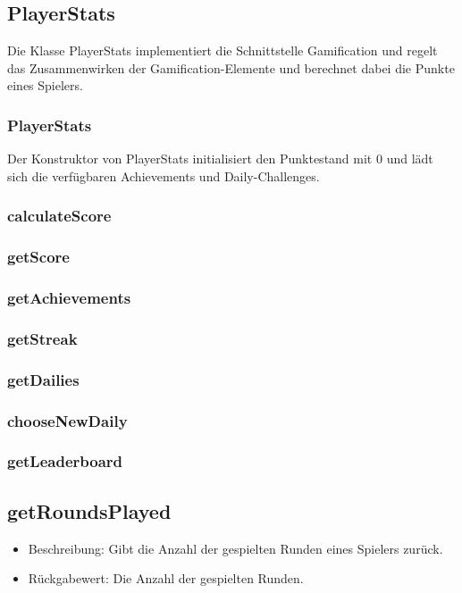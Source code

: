 \documentclass[a4paper]{scrreprt}
\begin{document}
	\subsection{PlayerStats}
	Die Klasse PlayerStats implementiert die Schnittstelle Gamification und regelt das Zusammenwirken der Gamification-Elemente und berechnet dabei die Punkte eines Spielers.
	\subsubsection{PlayerStats}
	Der Konstruktor von PlayerStats initialisiert den Punktestand mit 0 und lädt sich die verfügbaren Achievements und Daily-Challenges.
	\subsubsection{calculateScore}
	\subsubsection{getScore}
	\subsubsection{getAchievements}
	\subsubsection{getStreak}
	\subsubsection{getDailies}
	\subsubsection{chooseNewDaily}
	\subsubsection{getLeaderboard}
	\subsection{getRoundsPlayed}
	\begin{itemize}
		\item Beschreibung: Gibt die Anzahl der gespielten Runden eines Spielers zurück.
		\item Rückgabewert: Die Anzahl der gespielten Runden.
	\end{itemize}
\end{document}

